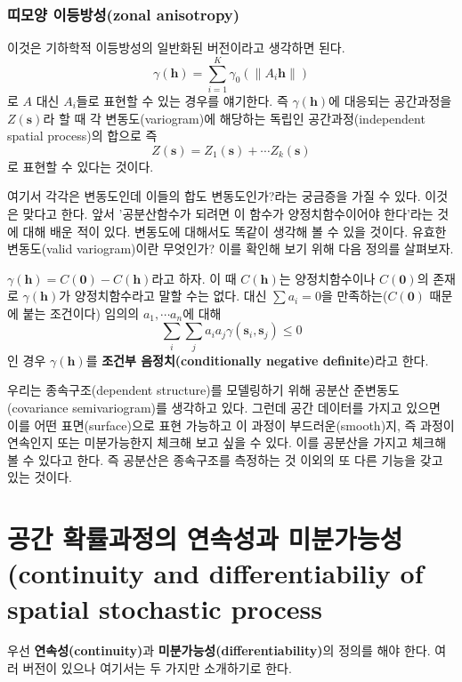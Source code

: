 \documentclass[b5paper,]{scrbook}
\theoremstyle{plain}
\theoremstyle{definition}
\numberwithin{equation}{section}
\begin{document}
\hypertarget{-zonal-anisotropy}{%
\subsubsection{띠모양 이등방성(zonal anisotropy)}\label{-zonal-anisotropy}}

이것은 기하학적 이등방성의 일반화된 버전이라고 생각하면 된다.
\[\gamma(\mathbf{h})=\sum_{i=1}^{K}\gamma_{0}(\|A_{i}\mathbf{h}\|)\]
로 \(A\) 대신 \(A_{i}\)들로 표현할 수 있는 경우를 얘기한다. 즉 \(\gamma(\mathbf{h})\)에 대응되는 공간과정을 \(Z(\mathbf{s})\)라 할 때 각 변동도(variogram)에 해당하는 독립인 공간과정(independent spatial process)의 합으로 즉
\[Z(\mathbf{s})=Z_{1}(\mathbf{s})+ \cdots Z_{k}(\mathbf{s})\]
로 표현할 수 있다는 것이다.

여기서 각각은 변동도인데 이들의 합도 변동도인가?라는 궁금증을 가질 수 있다. 이것은 맞다고 한다. 앞서 '공분산함수가 되려면 이 함수가 양정치함수이어야 한다'라는 것에 대해 배운 적이 있다. 변동도에 대해서도 똑같이 생각해 볼 수 있을 것이다. 유효한 변동도(valid variogram)이란 무엇인가? 이를 확인해 보기 위해 다음 정의를 살펴보자.

\(\gamma(\mathbf{h})=C(\mathbf{0})-C(\mathbf{h})\)라고 하자. 이 때 \(C(\mathbf{h})\)는 양정치함수이나 \(C(\mathbf{0})\)의 존재로 \(\gamma(\mathbf{h})\)가 양정치함수라고 말할 수는 없다. 대신 \(\sum a_{i}=0\)을 만족하는(\(C(\mathbf{0})\) 때문에 붙는 조건이다) 임의의 \(a_{1}, \cdots a_{n}\)에 대해
\[\sum_{i}\sum_{j}a_{i}a_{j}\gamma(\mathbf{s}_{i},\mathbf{s}_{j}) \leq 0\]
인 경우 \(\gamma(\mathbf{h})\)를 \textbf{조건부 음정치(conditionally negative definite)}라고 한다.

우리는 종속구조(dependent structure)를 모델링하기 위해 공분산 준변동도(covariance semivariogram)를 생각하고 있다. 그런데 공간 데이터를 가지고 있으면 이를 어떤 표면(surface)으로 표현 가능하고 이 과정이 부드러운(smooth)지, 즉 과정이 연속인지 또는 미분가능한지 체크해 보고 싶을 수 있다. 이를 공분산을 가지고 체크해 볼 수 있다고 한다. 즉 공분산은 종속구조를 측정하는 것 이외의 또 다른 기능을 갖고 있는 것이다.

\hypertarget{---continuity-and-differentiabiliy-of-spatial-stochastic-process}{%
\section{공간 확률과정의 연속성과 미분가능성(continuity and differentiabiliy of spatial stochastic process}\label{---continuity-and-differentiabiliy-of-spatial-stochastic-process}}

우선 \textbf{연속성(continuity)}과 \textbf{미분가능성(differentiability)}의 정의를 해야 한다. 여러 버전이 있으나 여기서는 두 가지만 소개하기로 한다.
\end{document}
